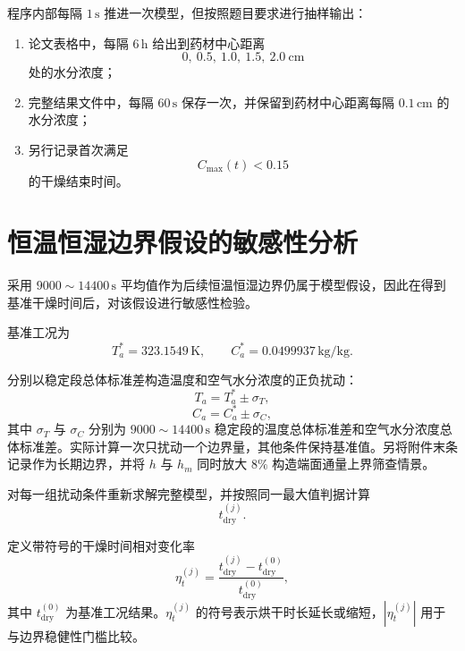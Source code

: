 \documentclass[UTF8,a4paper,12pt]{ctexart}
\begin{document}
程序内部每隔 $1\,\mathrm{s}$ 推进一次模型，但按照题目要求进行抽样输出：

\begin{enumerate}
    \item 论文表格中，每隔 $6\,\mathrm{h}$ 给出到药材中心距离
    \[
    0,\ 0.5,\ 1.0,\ 1.5,\ 2.0\ \mathrm{cm}
    \]
    处的水分浓度；
    \item 完整结果文件中，每隔 $60\,\mathrm{s}$ 保存一次，并保留到药材中心距离每隔 $0.1\,\mathrm{cm}$ 的水分浓度；
    \item 另行记录首次满足
    \[
    C_{\max}(t)<0.15
    \]
    的干燥结束时间。
\end{enumerate}

\section{恒温恒湿边界假设的敏感性分析}

采用 $9000\sim14400\,\mathrm{s}$ 平均值作为后续恒温恒湿边界仍属于模型假设，因此在得到基准干燥时间后，对该假设进行敏感性检验。

基准工况为
\begin{equation}
    T_a^\ast=323.1549\,\mathrm{K},
    \qquad
    C_a^\ast=0.0499937\,\mathrm{kg/kg}.
\end{equation}

分别以稳定段总体标准差构造温度和空气水分浓度的正负扰动：
\begin{equation}
    T_a=T_a^\ast\pm\sigma_T,
\end{equation}
\begin{equation}
    C_a=C_a^\ast\pm\sigma_C,
\end{equation}
其中 $\sigma_T$ 与 $\sigma_C$ 分别为 $9000\sim14400\,\mathrm{s}$ 稳定段的温度总体标准差和空气水分浓度总体标准差。实际计算一次只扰动一个边界量，其他条件保持基准值。另将附件末条记录作为长期边界，并将 $h$ 与 $h_m$ 同时放大 $8\%$ 构造端面通量上界筛查情景。

对每一组扰动条件重新求解完整模型，并按照同一最大值判据计算
\[
t_{\mathrm{dry}}^{(j)}.
\]

定义带符号的干燥时间相对变化率
\begin{equation}
    \eta_t^{(j)}
    =
    \frac{
        t_{\mathrm{dry}}^{(j)}
        -
        t_{\mathrm{dry}}^{(0)}
    }{
        t_{\mathrm{dry}}^{(0)}
    },
    \label{eq:sensitivity}
\end{equation}
其中 $t_{\mathrm{dry}}^{(0)}$ 为基准工况结果。$\eta_t^{(j)}$ 的符号表示烘干时长延长或缩短，$|\eta_t^{(j)}|$ 用于与边界稳健性门槛比较。
\end{document}
